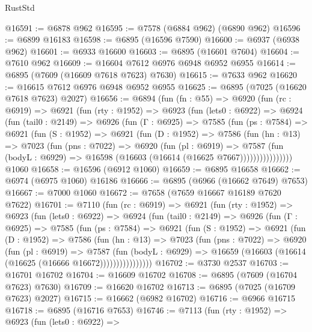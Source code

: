 \begin{lexlean}{RustStd}
\begin{coremodule}
@16591 := @6878 @962
@16595 := @7578 (@6884 @962) (@6890 @962)
@16596 := @6899 @16183
@16598 := @6895 (@16596 @7590)
@16600 := @6937 (@6938 @962)
@16601 := @6933 @16600
@16603 := @6895 (@16601 @7604)
@16604 := @7610 @962
@16609 := @16604 @7612 @6976 @6948 @6952 @6955
@16614 := @6895 (@7609 (@16609 @7618 @7623) @7630)
@16615 := @7633 @962
@16620 := @16615 @7612 @6976 @6948 @6952 @6955
@16625 := @6895 (@7025 (@16620 @7618 @7623) @2027)
@16656 := @6894
    (fun (fn : @55) =>
    @6920
      (fun (rc : @6919) =>
      @6921
        (fun (rty : @1952) =>
        @6923
          (fun (lets0 : @6922) =>
          @6924
            (fun (tail0 : @2149) =>
            @6926
              (fun (Γ : @6925) =>
              @7585
                (fun (ps : @7584) =>
                @6921
                  (fun (S : @1952) =>
                  @6921
                    (fun (D : @1952) =>
                    @7586
                      (fun (hn : @13) =>
                      @7023
                        (fun (pns : @7022) =>
                        @6920
                          (fun (pl : @6919) =>
                          @7587
                            (fun (bodyL : @6929) =>
                            @16598 (@16603 (@16614 (@16625 @7667))))))))))))))))
    @1060
@16658 := @16596 (@6912 @1060)
@16659 := @6895 @16658
@16662 := @6974 (@6975 @1060) @16186
@16666 := @6895 (@6966 (@16662 @7649) @7653)
@16667 := @7000 @1060
@16672 := @7658 (@7659 @16667 @16189 @7620 @7622)
@16701 := @7110
    (fun (rc : @6919) =>
    @6921
      (fun (rty : @1952) =>
      @6923
        (fun (lets0 : @6922) =>
        @6924
          (fun (tail0 : @2149) =>
          @6926
            (fun (Γ : @6925) =>
            @7585
              (fun (ps : @7584) =>
              @6921
                (fun (S : @1952) =>
                @6921
                  (fun (D : @1952) =>
                  @7586
                    (fun (hn : @13) =>
                    @7023
                      (fun (pns : @7022) =>
                      @6920
                        (fun (pl : @6919) =>
                        @7587
                          (fun (bodyL : @6929) =>
                          @16659 (@16603 (@16614 (@16625 (@16666 @16672))))))))))))))))
@16702 := @3730 @2537
@16703 := @16701 @16702
@16704 := @16609 @16702
@16708 := @6895 (@7609 (@16704 @7623) @7630)
@16709 := @16620 @16702
@16713 := @6895 (@7025 (@16709 @7623) @2027)
@16715 := @16662 (@6982 @16702)
@16716 := @6966 @16715
@16718 := @6895 (@16716 @7653)
@16746 := @7113
    (fun (rty : @1952) =>
    @6923
      (fun (lets0 : @6922) =>

\end{coremodule}
\end{lexlean}
